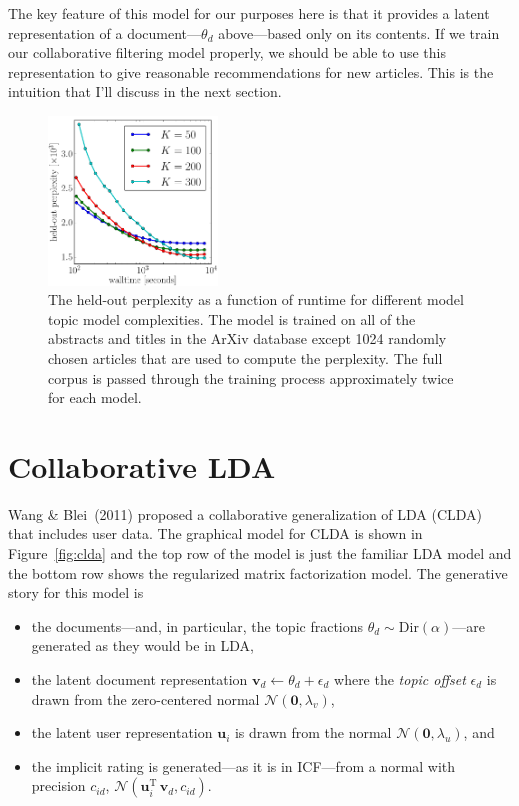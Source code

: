 \documentclass[11pt]{article}
\newcommand{\fig}[1]{Figure~\ref{fig:#1}}
\newcommand{\figlabel}[1]{\label{fig:#1}}
\begin{document}
The key feature of this model for our purposes here is that it provides a
latent representation of a document---$\theta_d$ above---based only on its
contents.
If we train our collaborative filtering model properly, we should be able to
use this representation to give reasonable recommendations for new articles.
This is the intuition that I'll discuss in the next section.

\begin{figure}
\centering
\includegraphics[width=0.4\textwidth]{lda-results-k.pdf}
\caption{%
The held-out perplexity as a function of runtime for different model
topic model complexities.
The model is trained on all of the abstracts and titles in the ArXiv database
except 1024 randomly chosen articles that are used to compute the perplexity.
The full corpus is passed through the training process approximately twice for
each model.
\figlabel{lda-results}}
\end{figure}

\section{Collaborative LDA}

Wang \& Blei~(2011) proposed a collaborative generalization of LDA (CLDA) that
includes user data.
The graphical model for CLDA is shown in \fig{clda} and the top row of the
model is just the familiar LDA model and the bottom row shows the regularized
matrix factorization model.
The generative story for this model is
\begin{itemize}
\item{the documents---and, in particular, the topic fractions $\theta_d \sim
\mathrm{Dir}(\alpha)$---are generated as they would be in LDA,}
\item{the latent document representation $\mathbf{v}_d \gets \theta_d +
\epsilon_d$ where the \emph{topic offset} $\epsilon_d$ is drawn from the
zero-centered normal $\mathcal{N} (\mathbf{0},\lambda_v)$,}
\item{the latent user representation $\mathbf{u}_i$ is drawn from the normal
$\mathcal{N}(\mathbf{0},\lambda_u)$, and}
\item{the implicit rating is generated---as it is in ICF---from a normal with
precision $c_{id}$,
$\mathcal{N}(\mathbf{u}_i^\mathrm{T}\,\mathbf{v}_d,c_{id})$.}
\end{itemize}
\end{document}

